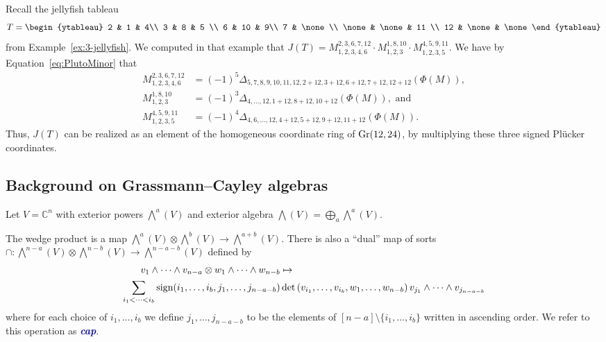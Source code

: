 \documentclass[ALCO, Unicode]{cedram}
\numberwithin{equation}{section}
\newcommand{\newword}[1]{\textcolor{darkblue}{\textbf{\emph{#1}}}}
\begin{document}
\begin{example}
Recall the jellyfish tableau
\[
T= \begin{ytableau}
2 & 1 & 4\\
3 & 8 & 5 \\
6 & 10 & 9\\
7 & \none \\
\none & \none & 11 \\
12 & \none & \none
\end{ytableau}
\] from Example~\ref{ex:3-jellyfish}. We computed in that example that $J(T)= M_{1,2,3,4,6}^{2,3,6,7,12} \cdot M_{1,2,3}^{1,8,10}\cdot M_{1,2,3,5}^{4,5,9,11}$.
We have by Equation~\eqref{eq:PlutoMinor} that
\begin{align*}M_{1,2,3,4,6}^{2,3,6,7,12} &=(-1)^5\Delta_{5,7,8,9,10,11,12,2+12,3+12,6+12,7+12,12+12}(\Phi(M)), \\
M_{1,2,3}^{1,8,10} &= (-1)^3\Delta_{4,\dots,12,1+12,8+12,10+12}(\Phi(M)), \text{ and} \\ M_{1,2,3,5}^{4,5,9,11} &= (-1)^4\Delta_{4,6,\ldots,12,4+12,5+12,9+12,11+12}(\Phi(M)).\end{align*}
Thus, $J(T)$ can be realized as an element of the homogeneous coordinate ring of ${\rm Gr}(12,24)$, by multiplying these three signed Pl\"ucker coordinates.
\end{example}

\subsection{Background on Grassmann--Cayley algebras}\label{sec:GrassmanCayleyalgebras}
Let $V = \mathbb{C}^n$ with exterior powers $\bigwedge^a(V) $ and exterior algebra $\bigwedge(V) = \bigoplus_{a} \bigwedge^a(V)$. 

The wedge product is a map $\bigwedge^a(V) \otimes \bigwedge^b(V) \to \bigwedge^{a+b}(V)$. There is also a ``dual'' map of sorts $\cap \colon \bigwedge^{n-a}(V) \otimes \bigwedge^{n-b}(V) \to \bigwedge^{n-a-b}(V)$ defined by
{\small
\begin{align}\label{eq:meetoperation}
v_1 \wedge \cdots \wedge v_{n-a} \otimes w_1 \wedge \cdots \wedge w_{n-b} &\mapsto \\ \sum_{i_1 < \cdots < i_{b}} {\rm sign}(i_1,\dots,i_b,j_1,\dots,j_{n-a-b}) &\det\left(v_{i_1},\dots,v_{i_b},w_1,\dots,w_{n-b}\right)v_{j_1} \wedge \cdots \wedge v_{j_{n-a-b}}\nonumber
\end{align}
}
where for each choice of $i_1,\dots,i_b$ we define $j_1,\dots,j_{n-a-b}$ to be the elements of $[n-a] \setminus \{i_1,\dots,i_b\}$ written in ascending order. We refer to this operation as \newword{cap}.
\end{document}
